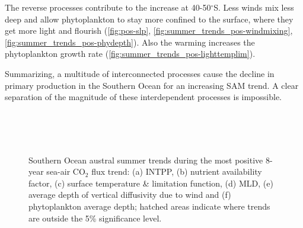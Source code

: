The reverse processes contribute to the increase at 40-50$^\circ$S. Less winds mix less deep and allow phytoplankton to stay more confined to the surface, where they get more light and flourish (\autoref{fig:pos-slp}, \ref{fig:summer_trends_pos-windmixing}, \ref{fig:summer_trends_pos-phydepth}). Also the warming increases the phytoplankton growth rate (\autoref{fig:summer_trends_pos-lighttemplim}).\newline

Summarizing, a multitude of interconnected processes cause the decline in primary production in the Southern Ocean for an increasing \acs{SAM} trend. A clear separation of the magnitude of these interdependent processes is impossible.
 
\begin{figure}[bth]
        \myfloatalign
         \\
         
         \\
         
         \\
        \caption{Southern Ocean austral summer trends during the most positive 8-year sea-air CO$_2$ flux trend: (a) \acf{INTPP}, (b) nutrient availability factor, (c) surface temperature \& limitation function, (d) \acf{MLD}, (e) average depth of vertical diffusivity due to wind and (f) phytoplankton average depth; hatched areas indicate where trends are outside the 5\% significance level.} \label{fig:summer_trends_pos}
\end{figure}




